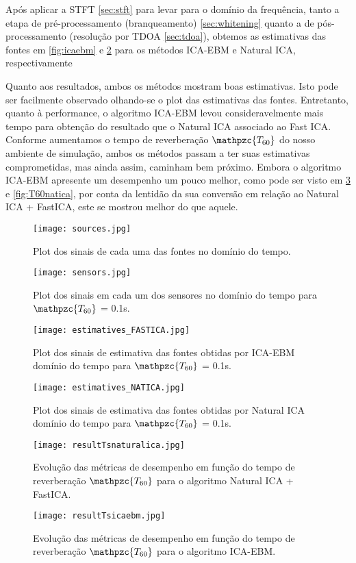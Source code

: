     Após aplicar a STFT \ref{sec:stft} para levar para o domínio da frequência, tanto a etapa de pré-processamento (branqueamento) \ref{sec:whitening} quanto a de pós-processamento (resolução por TDOA \ref{sec:tdoa}), obtemos as estimativas das fontes em \ref{fig:icaebm} e \ref{fig:natica} para os métodos ICA-EBM e Natural ICA, respectivamente 
    
    Quanto aos resultados, ambos os métodos mostram boas estimativas. Isto pode ser facilmente observado olhando-se o plot das estimativas das fontes. Entretanto, quanto à performance, o algoritmo ICA-EBM levou consideravelmente mais tempo para obtenção do resultado que o Natural ICA associado ao Fast ICA.
    Conforme aumentamos o tempo de reverberação $\mathpzc{T_{60}}$ do nosso ambiente de simulação, ambos os métodos passam a ter suas estimativas comprometidas, mas ainda assim, caminham bem próximo. Embora o algoritmo ICA-EBM apresente um desempenho um pouco melhor, como pode ser visto em \ref{fig:T60icaebm} e \ref{fig:T60natica}, por conta da lentidão da sua conversão em relação ao Natural ICA + FastICA, este se mostrou melhor do que aquele.
    
    \begin{figure}
        \centering
        \texttt{[image: sources.jpg]}
            \caption{Plot dos sinais de cada uma das fontes no domínio do tempo.}
        \label{fig:sources}
        \texttt{[image: sensors.jpg]}
            \caption{Plot dos sinais em cada um dos sensores no domínio do tempo para $\mathpzc{T_{60}}$ = 0.1s.}
        \label{fig:sensors}
    \end{figure}
    
    \begin{figure}
        \centering
        \texttt{[image: estimatives\_FASTICA.jpg]}
        \caption{Plot dos sinais de estimativa das fontes obtidas por ICA-EBM domínio do tempo para $\mathpzc{T_{60}}$ = 0.1s.}
        \label{fig:icaebm}
        \texttt{[image: estimatives\_NATICA.jpg]}
        \caption{Plot dos sinais de estimativa das fontes obtidas por Natural ICA domínio do tempo para $\mathpzc{T_{60}}$ = 0.1s.}
        \label{fig:natica}
    \end{figure}
    
    
    \begin{figure}
        \centering
        \texttt{[image: resultTsnaturalica.jpg]}
        \caption{Evolução das métricas de desempenho em função do tempo de reverberação $\mathpzc{T_{60}}$ para o algoritmo Natural ICA + FastICA.}
        \label{fig:T60natica}
         \texttt{[image: resultTsicaebm.jpg]}
        \caption{Evolução das métricas de desempenho em função do tempo de reverberação $\mathpzc{T_{60}}$ para o algoritmo ICA-EBM.}
        \label{fig:T60icaebm}
    \end{figure}
    

